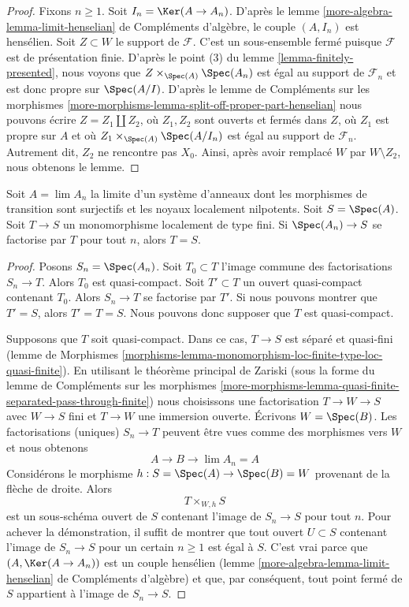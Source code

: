 \begin{proof}
Fixons $n \geq 1$. Soit $I_n = \Ker(A \to A_n)$.
D'après le lemme \ref{more-algebra-lemma-limit-henselian} de Compléments d'algèbre,
le couple $(A, I_n)$ est hensélien.
Soit $Z \subset W$ le support de $\mathcal{F}$.
C'est un sous-ensemble fermé puisque $\mathcal{F}$ est de présentation finie.
D'après le point (3) du lemme \ref{lemma-finitely-presented},
nous voyons que $Z \times_{\Spec(A)} \Spec(A_n)$
est égal au support de $\mathcal{F}_n$ et est donc
propre sur $\Spec(A/I)$.
D'après le lemme de Compléments sur les morphismes
\ref{more-morphisms-lemma-split-off-proper-part-henselian}
nous pouvons écrire $Z = Z_1 \amalg Z_2$, où $Z_1, Z_2$ sont ouverts et
fermés dans $Z$, où $Z_1$ est propre
sur $A$ et où $Z_1 \times_{\Spec(A)} \Spec(A/I_n)$
est égal au support de $\mathcal{F}_n$.
Autrement dit, $Z_2$ ne rencontre pas $X_0$.
Ainsi, après avoir remplacé $W$ par $W \setminus Z_2$, nous obtenons le lemme.
\end{proof}

\begin{lemma}
\label{lemma-monomorphism-isomorphism}
Soit $A = \lim A_n$ la limite d'un système d'anneaux
dont les morphismes de transition sont surjectifs et les noyaux
localement nilpotents. Soit $S = \Spec(A)$. Soit $T \to S$ un monomorphisme
localement de type fini. Si $\Spec(A_n) \to S$
se factorise par $T$ pour tout $n$, alors $T = S$.
\end{lemma}

\begin{proof}
Posons $S_n = \Spec(A_n)$. Soit $T_0 \subset T$ l'image
commune des factorisations $S_n \to T$. Alors $T_0$ est quasi-compact.
Soit $T' \subset T$ un ouvert quasi-compact contenant $T_0$.
Alors $S_n \to T$ se factorise par $T'$.
Si nous pouvons montrer que $T' = S$, alors $T' = T = S$.
Nous pouvons donc supposer que $T$ est quasi-compact.

\medskip\noindent
Supposons que $T$ soit quasi-compact.
Dans ce cas, $T \to S$ est séparé et quasi-fini
(lemme de Morphismes
\ref{morphisms-lemma-monomorphism-loc-finite-type-loc-quasi-finite}).
En utilisant le théorème principal de Zariski
(sous la forme du lemme de Compléments sur les morphismes
\ref{more-morphisms-lemma-quasi-finite-separated-pass-through-finite})
nous choisissons une factorisation $T \to W \to S$ avec $W \to S$ fini
et $T \to W$ une immersion ouverte. Écrivons $W = \Spec(B)$.
Les factorisations (uniques) $S_n \to T$ peuvent être vues
comme des morphismes vers $W$ et nous obtenons
$$
A \longrightarrow B \longrightarrow \lim A_n = A
$$
Considérons le morphisme $h : S = \Spec(A) \to \Spec(B) = W$ provenant
de la flèche de droite. Alors
$$
T \times_{W, h} S
$$
est un sous-schéma ouvert de $S$ contenant l'image de $S_n \to S$ pour tout $n$.
Pour achever la démonstration, il suffit de montrer que tout ouvert $U \subset S$
contenant l'image de $S_n \to S$ pour un certain $n \geq 1$ est égal à $S$.
C'est vrai parce que $(A, \Ker(A \to A_n))$ est un couple hensélien
(lemme \ref{more-algebra-lemma-limit-henselian} de Compléments d'algèbre)
et que, par conséquent, tout point fermé de $S$ appartient à l'image de $S_n \to S$.
\end{proof}

